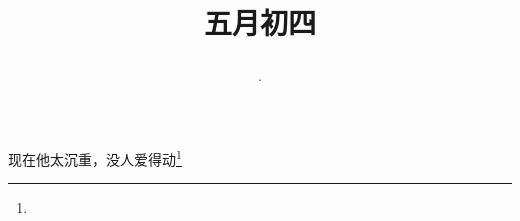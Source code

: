 \title{\date[d=9,m=6,y=2024][year:cn-y,年,month:cn,day:cn,日,·,weekday]·五月初四 }
现在他太沉重，没人爱得动\footnote{ }

